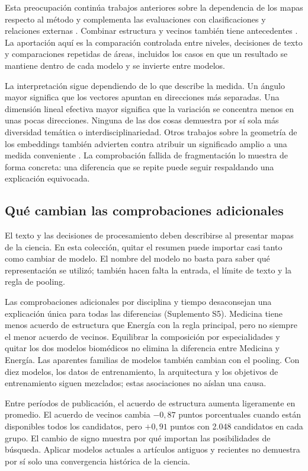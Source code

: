 \documentclass[12pt]{article}
\begin{document}
Esta preocupación continúa trabajos anteriores sobre la dependencia de los mapas respecto al método \citep{refa0d2d707e6,ref6a2f5912bc} y complementa las evaluaciones con clasificaciones y relaciones externas \citep{refbe130e2973,refc0e2cc29e0}. Combinar estructura y vecinos también tiene antecedentes \citep{ref4e1e0d5582}. La aportación aquí es la comparación controlada entre niveles, decisiones de texto y comparaciones repetidas de áreas, incluidos los casos en que un resultado se mantiene dentro de cada modelo y se invierte entre modelos.

La interpretación sigue dependiendo de lo que describe la medida. Un ángulo mayor significa que los vectores apuntan en direcciones más separadas. Una dimensión lineal efectiva mayor significa que la variación se concentra menos en unas pocas direcciones. Ninguna de las dos cosas demuestra por sí sola más diversidad temática o interdisciplinariedad. Otros trabajos sobre la geometría de los embeddings también advierten contra atribuir un significado amplio a una medida conveniente \citep{rudman-etal-2022-isoscore}. La comprobación fallida de fragmentación lo muestra de forma concreta: una diferencia que se repite puede seguir respaldando una explicación equivocada.

\subsection{Qué cambian las comprobaciones adicionales}
El texto y las decisiones de procesamiento deben describirse al presentar mapas de la ciencia. En esta colección, quitar el resumen puede importar casi tanto como cambiar de modelo. El nombre del modelo no basta para saber qué representación se utilizó; también hacen falta la entrada, el límite de texto y la regla de pooling.

Las comprobaciones adicionales por disciplina y tiempo desaconsejan una explicación única para todas las diferencias (Suplemento S5). Medicina tiene menos acuerdo de estructura que Energía con la regla principal, pero no siempre el menor acuerdo de vecinos. Equilibrar la composición por especialidades y quitar los dos modelos biomédicos no elimina la diferencia entre Medicina y Energía. Las aparentes familias de modelos también cambian con el pooling. Con diez modelos, los datos de entrenamiento, la arquitectura y los objetivos de entrenamiento siguen mezclados; estas asociaciones no aíslan una causa.

Entre períodos de publicación, el acuerdo de estructura aumenta ligeramente en promedio. El acuerdo de vecinos cambia $-0,87$ puntos porcentuales cuando están disponibles todos los candidatos, pero $+0,91$ puntos con 2.048 candidatos en cada grupo. El cambio de signo muestra por qué importan las posibilidades de búsqueda. Aplicar modelos actuales a artículos antiguos y recientes no demuestra por sí solo una convergencia histórica de la ciencia.
\end{document}

